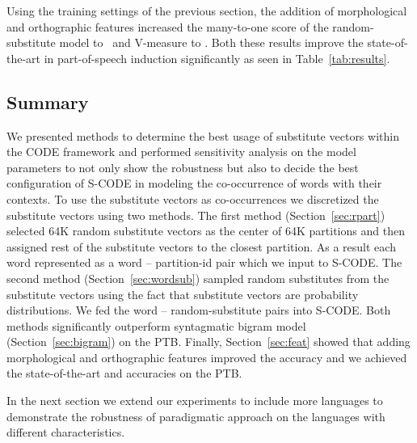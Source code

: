 Using the training settings of the previous section, the addition of
morphological and orthographic features increased the many-to-one
score of the random-substitute model to \ftmto\ and V-measure to
\ftvm.  Both these results improve the state-of-the-art in
part-of-speech induction significantly as seen in
Table~\ref{tab:results}.

\subsection{Summary}
\label{sec:expsum}

We presented methods to determine the best usage of substitute vectors
within the CODE framework and performed sensitivity analysis on the
model parameters to not only show the robustness but also to decide
the best configuration of S-CODE in modeling the co-occurrence of
words with their contexts.  To use the substitute vectors as
co-occurrences we discretized the substitute vectors using two
methods.  The first method (Section~\ref{sec:rpart}) selected 64K
random substitute vectors as the center of 64K partitions and then
assigned rest of the substitute vectors to the closest partition.  As
a result each word represented as a word -- partition-id pair which we
input to S-CODE. The second method (Section~\ref{sec:wordsub}) sampled
random substitutes from the substitute vectors using the fact that
substitute vectors are probability distributions.  We fed the word --
random-substitute pairs into S-CODE.  Both methods significantly
outperform syntagmatic bigram model (Section~\ref{sec:bigram}) on the
PTB.  Finally, Section~\ref{sec:feat} showed that adding morphological
and orthographic features improved the accuracy and we achieved the
state-of-the-art \mto and \vm accuracies on the PTB.

In the next section we extend our experiments to include more
languages to demonstrate the robustness of paradigmatic approach on
the languages with different characteristics.
